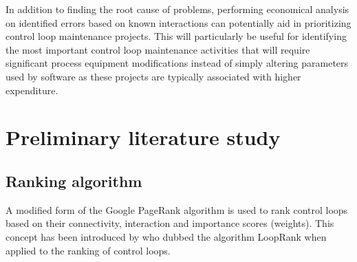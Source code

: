 \documentclass{article}
\begin{document}

%
%
%

In addition to finding the root cause of problems, performing economical analysis on identified errors based on known interactions can potentially aid in prioritizing control loop maintenance projects.
This will particularly be useful for identifying the most important control loop maintenance activities that will require significant process equipment modifications instead of simply altering parameters used by software as these projects are typically associated with higher expenditure.


%

\newpage
\section{Preliminary literature study}

\subsection{Ranking algorithm}

A modified form of the Google PageRank algorithm \citep{Bryan2006} is used to rank control loops based on their connectivity, interaction and importance scores (weights). This concept has been introduced by \citet{Farenzena2009} who dubbed the algorithm LoopRank when applied to the ranking of control loops.
\end{document}
